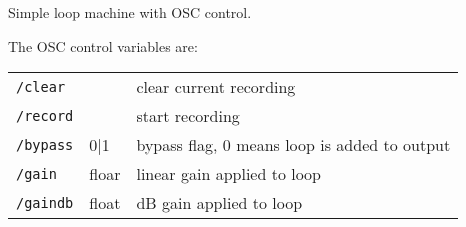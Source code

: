 Simple loop machine with OSC control.



The OSC control variables are:
\begin{tabular}{lll}
{\tt /clear}  &       & clear current recording                      \\
{\tt /record} &       & start recording                              \\
{\tt /bypass} & 0|1   & bypass flag, 0 means loop is added to output \\
{\tt /gain}   & floar & linear gain applied to loop                  \\
{\tt /gaindb} & float & dB gain applied to loop                      \\
\end{tabular}
